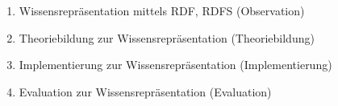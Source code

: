 \begin{enumerate}[label=FZ \arabic*]
\begin{enumerate}[label=\theenumi.\arabic*]
\item Wissensrepräsentation mittels RDF, RDFS (Observation)
\item Theoriebildung zur Wissensrepräsentation (Theoriebildung)
\item Implementierung zur Wissensrepräsentation (Implementierung)
\item Evaluation zur Wissensrepräsentation (Evaluation)
\end{enumerate}

\end{enumerate}

